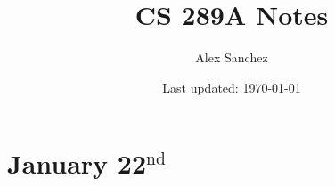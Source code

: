\documentclass[openany]{book}
\title{CS 289A Notes}
\author{Alex Sanchez}
\date{Last updated: \today}
\begin{document}
\maketitle

\tableofcontents

\chapter{January 22$^{\text{nd}}$}

\end{document}
